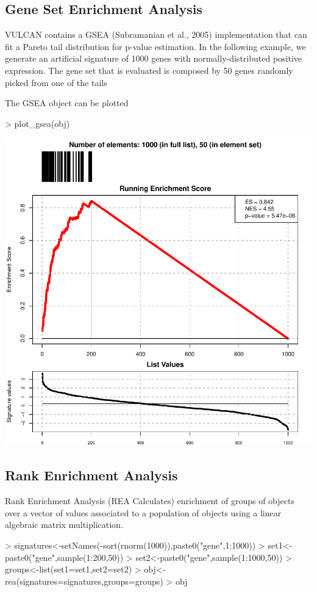 \documentclass{article}
\begin{document}
\subsection{Gene Set Enrichment Analysis}
VULCAN contains a GSEA (Subramanian et al., 2005) implementation that can fit a Pareto tail distribution for p-value estimation. In the following example, we generate an artificial signature of 1000 genes with normally-distributed positive expression. The gene set that is evaluated is composed by 50 genes randomly picked from one of the tails
\begin{Schunk}
\end{Schunk}
The GSEA object can be plotted
\begin{Schunk}
\begin{Sinput}
> plot_gsea(obj)
\end{Sinput}
\end{Schunk}
\includegraphics{vulcan-012}

\subsection{Rank Enrichment Analysis}
Rank Enrichment Analysis (REA Calculates) enrichment of groups of objects over a vector of values associated to a population of objects using a linear algebraic matrix multiplication.
\begin{Schunk}
\begin{Sinput}
> signatures<-setNames(-sort(rnorm(1000)),paste0("gene",1:1000))
> set1<-paste0("gene",sample(1:200,50))
> set2<-paste0("gene",sample(1:1000,50))
> groups<-list(set1=set1,set2=set2)
> obj<-rea(signatures=signatures,groups=groups)
> obj
\end{Sinput}
\end{Schunk}
\end{document}
